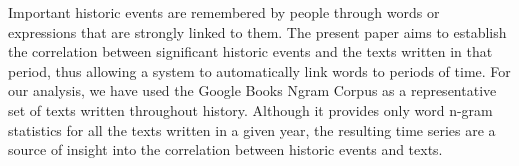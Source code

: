 Important historic events are remembered by people through words or expressions that are strongly linked to them. The present paper aims to establish the correlation between significant historic events and the texts written in that period, thus allowing a system to automatically link words to periods of time. For our analysis, we have used the Google Books Ngram Corpus as a representative set of texts written throughout history. Although it provides only word n-gram statistics for all the texts written in a given year, the resulting time series are a source of insight into the correlation between historic events and texts.
